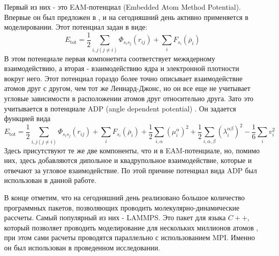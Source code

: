 Первый из них - это EAM-потенциал (Embedded Atom Method Potential). Впервые он был предложен в \cite{Daw}, и на сегодняшний день активно применяется в моделировании. Этот потенциал задан в виде:
\begin{equation}
 E_{\mathrm{tot}}=\frac{1}{2} \sum_{i,j(j\neq i)} \Phi_{s_i s_j}\left(r_{i j}\right)+\sum_{i} F_{s_i}\left(\overline{\rho}_{i}\right)
\end{equation}
В этом потенциале первая компонетнта соответствует межядерному взаимодействию, а вторая - взаимодействию ядра и электронной плотности вокруг него. Этот потенциал гораздо более точно описывает взаимодействие атомов друг с другом, чем тот же Леннард-Джонс, но он все еще не учитывает угловые зависимости в расположении атомов друг относительно друга. Зато это учитывается в потенциале ADP (angle dependent potential) \cite{mishin2005phase}. Он задается функцией вида
\begin{equation}
	E_{\mathrm{tot}}= \frac{1}{2} \sum_{i, j(j \neq i)} \Phi_{s_{i} s_{j}}\left(r_{i j}\right)+\sum_{i} F_{s_{i}}\left(\overline{\rho}_{i}\right)+\frac{1}{2} \sum_{i, \alpha}\left(\mu_{i}^{\alpha}\right)^{2} +\frac{1}{2} \sum_{i, \alpha, \beta}\left(\lambda_{i}^{\alpha \beta}\right)^{2}-\frac{1}{6} \sum_{i} v_{i}^{2}
\end{equation}
Здесь присутствуют те же две компоненты, что и в EAM-потенциале, но, помимо них, здесь добавляются дипольное и квадрупольное взаимодействие, которые и отвечают за угловое взаимодействие. По этой причине потенциал вида ADP был использован в данной работе.

В конце отметим, что на сегодняшний день реализовано большое количество программных пакетов, позволяющих проводить молекулярно-динамические рассчеты. Самый популярный из них - LAMMPS\cite{Plimpton}. Это пакет для языка $C++$, который позволяет проводить моделирование для нескольких миллионов атомов \cite{Gilyaev}, при этом сами расчеты проводятся параллельно с использованием MPI. Именно он был использован в проведенном исследовании.

